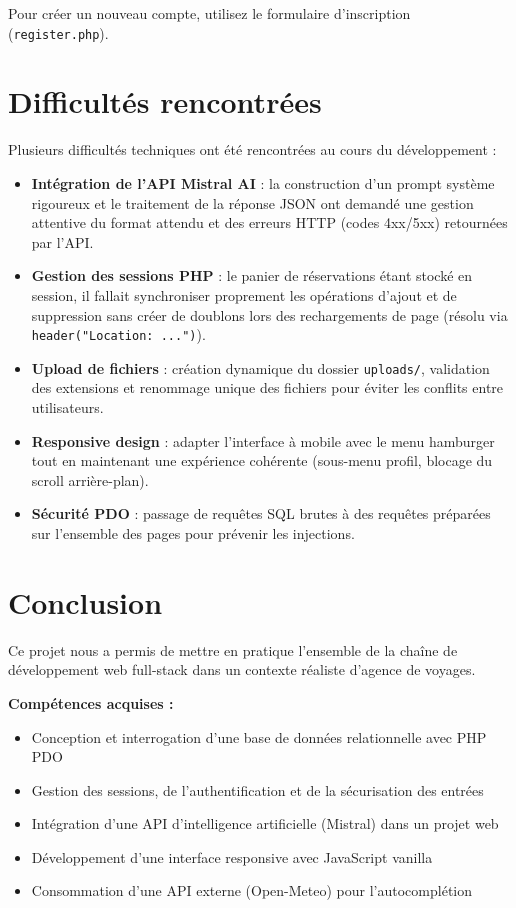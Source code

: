 \documentclass[a4paper,12pt]{article}
\begin{document}
Pour créer un nouveau compte, utilisez le formulaire d'inscription (\texttt{register.php}).

\section{Difficultés rencontrées}

Plusieurs difficultés techniques ont été rencontrées au cours du développement :

\begin{itemize}
  \item \textbf{Intégration de l'API Mistral AI} : la construction d'un prompt système rigoureux et le traitement de la réponse JSON ont demandé une gestion attentive du format attendu et des erreurs HTTP (codes 4xx/5xx) retournées par l'API.
  \item \textbf{Gestion des sessions PHP} : le panier de réservations étant stocké en session, il fallait synchroniser proprement les opérations d'ajout et de suppression sans créer de doublons lors des rechargements de page (résolu via \texttt{header("Location: ...")}).
  \item \textbf{Upload de fichiers} : création dynamique du dossier \texttt{uploads/}, validation des extensions et renommage unique des fichiers pour éviter les conflits entre utilisateurs.
  \item \textbf{Responsive design} : adapter l'interface à mobile avec le menu hamburger tout en maintenant une expérience cohérente (sous-menu profil, blocage du scroll arrière-plan).
  \item \textbf{Sécurité PDO} : passage de requêtes SQL brutes à des requêtes préparées sur l'ensemble des pages pour prévenir les injections.
\end{itemize}

\section{Conclusion}

Ce projet nous a permis de mettre en pratique l'ensemble de la chaîne de développement web full-stack dans un contexte réaliste d'agence de voyages.

\textbf{Compétences acquises :}
\begin{itemize}
  \item Conception et interrogation d'une base de données relationnelle avec PHP PDO
  \item Gestion des sessions, de l'authentification et de la sécurisation des entrées
  \item Intégration d'une API d'intelligence artificielle (Mistral) dans un projet web
  \item Développement d'une interface responsive avec JavaScript vanilla
  \item Consommation d'une API externe (Open-Meteo) pour l'autocomplétion
\end{itemize}
\end{document}
